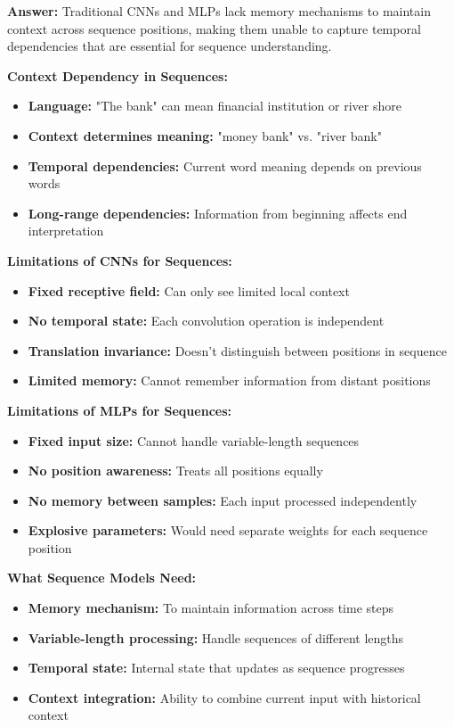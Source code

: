 \documentclass[12pt]{article}
\newcommand{\answer}[1]{{\color{answercolor}\textbf{Answer:} #1}}
\newcommand{\explanation}[1]{{\color{explanationcolor}#1}}
\begin{document}
\begin{enumerate}[(a)]
    \answer{Traditional CNNs and MLPs lack memory mechanisms to maintain context across sequence positions, making them unable to capture temporal dependencies that are essential for sequence understanding.}
    
    \explanation{
    \textbf{Context Dependency in Sequences:}
    \begin{itemize}
        \item \textbf{Language:} "The bank" can mean financial institution or river shore
        \item \textbf{Context determines meaning:} "money bank" vs. "river bank"
        \item \textbf{Temporal dependencies:} Current word meaning depends on previous words
        \item \textbf{Long-range dependencies:} Information from beginning affects end interpretation
    \end{itemize}
    
    \textbf{Limitations of CNNs for Sequences:}
    \begin{itemize}
        \item \textbf{Fixed receptive field:} Can only see limited local context
        \item \textbf{No temporal state:} Each convolution operation is independent
        \item \textbf{Translation invariance:} Doesn't distinguish between positions in sequence
        \item \textbf{Limited memory:} Cannot remember information from distant positions
    \end{itemize}
    
    \textbf{Limitations of MLPs for Sequences:}
    \begin{itemize}
        \item \textbf{Fixed input size:} Cannot handle variable-length sequences
        \item \textbf{No position awareness:} Treats all positions equally
        \item \textbf{No memory between samples:} Each input processed independently
        \item \textbf{Explosive parameters:} Would need separate weights for each sequence position
    \end{itemize}
    
    \textbf{What Sequence Models Need:}
    \begin{itemize}
        \item \textbf{Memory mechanism:} To maintain information across time steps
        \item \textbf{Variable-length processing:} Handle sequences of different lengths
        \item \textbf{Temporal state:} Internal state that updates as sequence progresses
        \item \textbf{Context integration:} Ability to combine current input with historical context
    \end{itemize}
    }
    

\end{enumerate}
\end{document}
